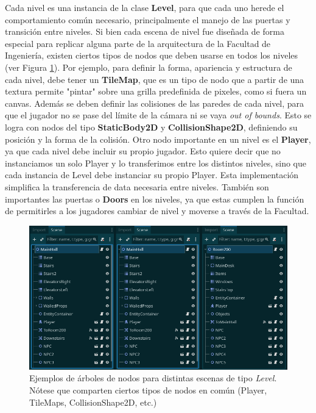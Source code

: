 Cada nivel es una instancia de la clase \textbf{Level}, para que cada uno herede el comportamiento común
necesario, principalmente el manejo de las puertas y transición entre niveles.
Si bien cada escena de nivel fue diseñada de forma especial para replicar alguna parte de la arquitectura de la Facultad de Ingeniería,
existen ciertos tipos de nodos que deben usarse en todos los niveles (ver Figura \ref{fig:level-nodes}).
Por ejemplo, para definir la forma, apariencia y estructura de cada nivel, debe tener un \textbf{TileMap},
que es un tipo de nodo que a partir de una textura permite "pintar" sobre
una grilla predefinida de pixeles, como si fuera un canvas. Además se deben definir las colisiones de las 
paredes de cada nivel, para que el jugador no se pase del límite de la cámara ni se vaya 
\textit{out of bounds}. Esto se logra con nodos del tipo \textbf{StaticBody2D} y \textbf{CollisionShape2D},
definiendo su posición y la forma de la colisión.
Otro nodo importante en un nivel es el \textbf{Player}, ya que cada nivel debe incluir su propio jugador.
Esto quiere decir que no instanciamos un solo Player y lo transferimos entre los distintos 
niveles, sino que cada instancia de Level debe instanciar su propio Player. Esta implementación
simplifica la transferencia de data necesaria entre niveles.
También son importantes las puertas o \textbf{Doors} en los niveles, ya que estas cumplen la función de
permitirles a los jugadores cambiar de nivel y moverse a través de la Facultad.

\begin{figure}[htbp]
    \centering
    \includegraphics[width=1.0\textwidth]{../assets/levels-tree-nodes.png}
    \caption{Ejemplos de árboles de nodos para distintas escenas de tipo \textit{Level}. Nótese que
            comparten ciertos tipos de nodos en común (Player, TileMaps, CollisionShape2D, etc.)}
    \label{fig:level-nodes}
\end{figure}

